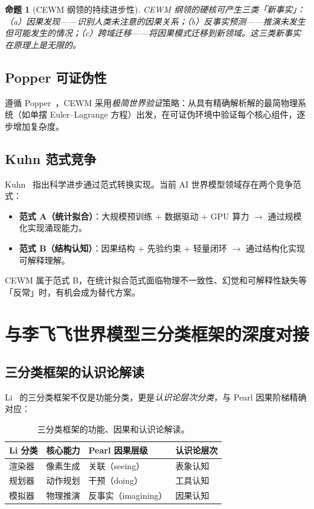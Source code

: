 \documentclass[11pt,a4paper]{article}
\newtheorem{proposition}{命题}[section]
\newcommand{\CEWM}{\textsc{CEWM}}
\begin{document}
\begin{proposition}[\CEWM{} 纲领的持续进步性]\label{prop:cewm-progress}
\CEWM{} 纲领的硬核可产生三类「新事实」：（a）因果发现——识别人类未注意的因果关系；（b）反事实预测——推演未发生但可能发生的情况；（c）跨域迁移——将因果模式迁移到新领域。这三类新事实在原理上是无限的。
\end{proposition}

\subsection{Popper 可证伪性}

遵循 Popper~\citeyearpar{popper1934logik}，\CEWM{} 采用\emph{极简世界验证}策略：从具有精确解析解的最简物理系统（如单摆 Euler--Lagrange 方程）出发，在可证伪环境中验证每个核心组件，逐步增加复杂度。

\subsection{Kuhn 范式竞争}

Kuhn~\citeyearpar{kuhn1962structure} 指出科学进步通过范式转换实现。当前 AI 世界模型领域存在两个竞争范式：
\begin{itemize}[nosep]
  \item \textbf{范式 A（统计拟合）}：大规模预训练 + 数据驱动 + GPU 算力 $\to$ 通过规模化实现涌现能力。
  \item \textbf{范式 B（结构认知）}：因果结构 + 先验约束 + 轻量闭环 $\to$ 通过结构化实现可解释理解。
\end{itemize}
\CEWM{} 属于范式 B，在统计拟合范式面临物理不一致性、幻觉和可解释性缺失等「反常」时，有机会成为替代方案。

\section{与李飞飞世界模型三分类框架的深度对接}\label{sec:li-framework}

\subsection{三分类框架的认识论解读}

Li~\citeyearpar{li2024worldmodels} 的三分类框架不仅是功能分类，更是\emph{认识论层次分类}，与 Pearl 因果阶梯精确对应：

\begin{table}[H]
\centering
\caption{三分类框架的功能、因果和认识论解读。}\label{tab:tripartite}
\small
\begin{tabularx}{\textwidth}{lXXX}
\toprule
\textbf{Li 分类} & \textbf{核心能力} & \textbf{Pearl 因果层级} & \textbf{认识论层次} \\
\midrule
渲染器 & 像素生成 & 关联（seeing） & 表象认知 \\
规划器 & 动作规划 & 干预（doing） & 工具认知 \\
模拟器 & 物理推演 & 反事实（imagining） & 因果认知 \\
\bottomrule
\end{tabularx}
\end{table}
\end{document}
